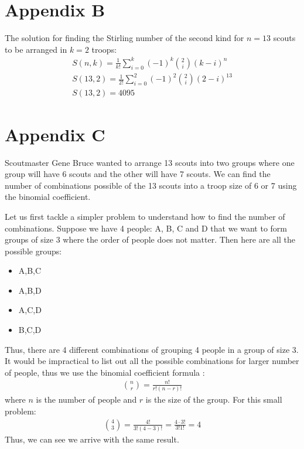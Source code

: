 \documentclass{amsart}
\theoremstyle{definition}
\theoremstyle{remark}
\numberwithin{equation}{section}
\begin{document}
\section*{Appendix B}
The solution for finding the Stirling number of the second kind for $n = 13$ scouts to be arranged in $k = 2$ troops:
\begin{gather*}
	S(n,k) = \frac{1}{k!} \sum_{i=0}^{k}(-1)^k {2 \choose i} (k - i)^{n} \\
	S(13,2) = \frac{1}{2!} \sum_{i=0}^{2}(-1)^2 {2 \choose i} (2 - i)^{13} \\
	S(13, 2) = 4095
\end{gather*}

\section*{Appendix C}
Scoutmaster Gene Bruce wanted to arrange 13 scouts into two groups where one group will have 6 scouts and the other will have 7 scouts. We can find the number of combinations possible of the 13 scouts into a troop size of 6 or 7 using the binomial coefficient.

Let us first tackle a simpler problem to understand how to find the number of combinations. Suppose we have 4 people: A, B, C and D that we want to form groups of size 3 where the order of people does not matter. Then here are all the possible groups:
\begin{itemize}
	\item A,B,C	
	\item A,B,D
	\item A,C,D	
	\item B,C,D
\end{itemize}
Thus, there are 4 different combinations of grouping 4 people in a group of size 3. It would be impractical to list out all the possible combinations for larger number of people, thus we use the binomial coefficient formula \cite{F}:
\begin{gather*}
	\binom{n}{r} = \frac{n!}{r!(n-r)!}
\end{gather*}
where $n$ is the number of people and $r$ is the size of the group. For this small problem:
\begin{gather*}
	\binom{4}{3} = \frac{4!}{3!(4-3)!} = \frac{4\cdot3!}{3!1!} = 4
\end{gather*} 
Thus, we can see we arrive with the same result.
\end{document}
